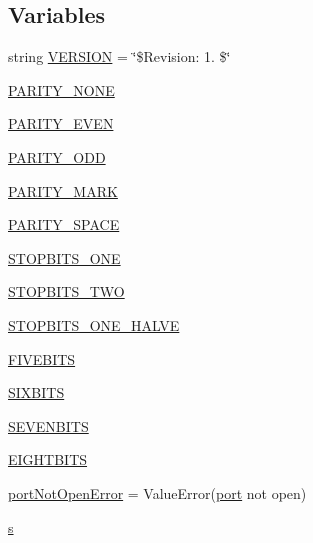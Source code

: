 \subsection*{Variables}
\begin{DoxyCompactItemize}
\item 
string \hyperlink{namespaceserial_1_1serialjava_a1d2a0a1a3b62ea93a1f5177204977a29}{V\+E\+R\+S\+I\+ON} = \char`\"{}\$Revision\+: 1. \$\char`\"{}
\item 
\hyperlink{namespaceserial_1_1serialjava_a6141554964da5eeacffedfa44c84211a}{P\+A\+R\+I\+T\+Y\+\_\+\+N\+O\+NE}
\item 
\hyperlink{namespaceserial_1_1serialjava_a8be404497a089fdd43665777f6bfd626}{P\+A\+R\+I\+T\+Y\+\_\+\+E\+V\+EN}
\item 
\hyperlink{namespaceserial_1_1serialjava_a5abe5d68cd7b6b224b6f8ba475e89078}{P\+A\+R\+I\+T\+Y\+\_\+\+O\+DD}
\item 
\hyperlink{namespaceserial_1_1serialjava_a6b481526d67bead7c4fb32557386d6bf}{P\+A\+R\+I\+T\+Y\+\_\+\+M\+A\+RK}
\item 
\hyperlink{namespaceserial_1_1serialjava_aaead0f60fb0518b56be4fa485680141e}{P\+A\+R\+I\+T\+Y\+\_\+\+S\+P\+A\+CE}
\item 
\hyperlink{namespaceserial_1_1serialjava_aa2188fd2fd7894097fd536a707f6ab14}{S\+T\+O\+P\+B\+I\+T\+S\+\_\+\+O\+NE}
\item 
\hyperlink{namespaceserial_1_1serialjava_a0d9a4d0672aa0af23411a3e19f795401}{S\+T\+O\+P\+B\+I\+T\+S\+\_\+\+T\+WO}
\item 
\hyperlink{namespaceserial_1_1serialjava_aedbbd917df2588918230ee03e1b17865}{S\+T\+O\+P\+B\+I\+T\+S\+\_\+\+O\+N\+E\+\_\+\+H\+A\+L\+VE}
\item 
\hyperlink{namespaceserial_1_1serialjava_a91fbd161d70da6263542802e735fc080}{F\+I\+V\+E\+B\+I\+TS}
\item 
\hyperlink{namespaceserial_1_1serialjava_a912f4518d75bc732a613ded3e5691c64}{S\+I\+X\+B\+I\+TS}
\item 
\hyperlink{namespaceserial_1_1serialjava_ab70ba3f1071d56f05dc5c42588c15dbe}{S\+E\+V\+E\+N\+B\+I\+TS}
\item 
\hyperlink{namespaceserial_1_1serialjava_ae5085ada49150183f269e16092b264c2}{E\+I\+G\+H\+T\+B\+I\+TS}
\item 
\hyperlink{namespaceserial_1_1serialjava_ad04063ae4ca2414f058a5040e70b49f0}{port\+Not\+Open\+Error} = Value\+Error(\textquotesingle{}\hyperlink{z1_2i2c_8c_a9f33b3195a1fecb0b114222456959431}{port} not open\textquotesingle{})
\item 
\hyperlink{namespaceserial_1_1serialjava_aa3340e982508ffb757dae29fd0a7c21c}{s}
\end{DoxyCompactItemize}


